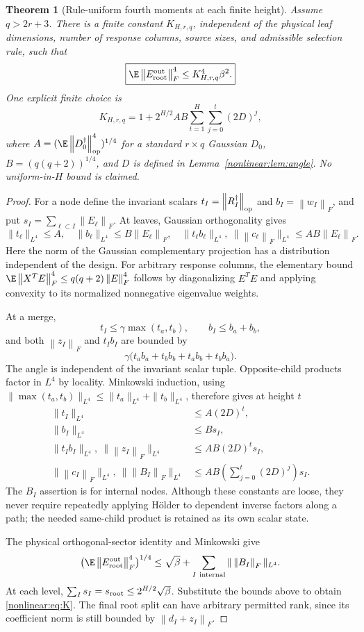 \documentclass[11pt,oneside,openany,a4paper]{book}
\numberwithin{equation}{chapter}
\newtheorem{theorem}{Theorem}[chapter]
\theoremstyle{definition}
\theoremstyle{remark}
\newcommand{\F}[1]{\left\lVert#1\right\rVert_F}
\newcommand{\op}[1]{\left\lVert#1\right\rVert_{\rm op}}
\begin{document}
\begin{theorem}[Rule-uniform fourth moments at each finite height]\label{nonlinear:thm:fourth}
Assume $q>2r+3$. There is a finite constant $K_{H,r,q}$, independent of the physical leaf dimensions, number of response columns, source sizes, and admissible selection rule, such that
\begin{equation}\label{nonlinear:eq:fourth}
 \boxed{\E\F{E_{\rm root}^{\rm out}}^4\le K_{H,r,q}^4\beta^2.}
\end{equation}
One explicit finite choice is
\begin{equation}\label{nonlinear:eq:K}
 K_{H,r,q}=1+2^{H/2}AB\sum_{t=1}^H\sum_{j=0}^t(2D)^j,
\end{equation}
where $A=(\E\op{D_0^\dagger}^4)^{1/4}$ for a standard $r\times q$ Gaussian $D_0$, $B=(q(q+2))^{1/4}$, and $D$ is defined in Lemma~\ref{nonlinear:lem:angle}. No uniform-in-$H$ bound is claimed.
\end{theorem}
\begin{proof}
For a node define the invariant scalars $t_I=\op{R_I^\dagger}$ and $b_I=\F{w_I}$, and put $s_I=\sum_{\ell\subset I}\F{E_\ell}$. At leaves, Gaussian orthogonality gives
\[
 \|t_\ell\|_{L^4}\le A,\quad
 \|b_\ell\|_{L^4}\le B\F{E_\ell},\quad
 \|t_\ell b_\ell\|_{L^4},\ \|\F{c_\ell}\|_{L^4}\le AB\F{E_\ell}.
\]
Here the norm of the Gaussian complementary projection has a distribution independent of the design. For arbitrary response columns, the elementary bound
$\E\F{X^TE}^4\le q(q+2)\F E^4$ follows by diagonalizing $E^TE$ and applying convexity to its normalized nonnegative eigenvalue weights.

At a merge,
\[
 t_I\le\gamma\max(t_a,t_b),\qquad b_I\le b_a+b_b,
\]
and both $\F{z_I}$ and $t_Ib_I$ are bounded by
\[
 \gamma\bigl(t_ab_a+t_bb_b+t_ab_b+t_bb_a\bigr).
\]
The angle is independent of the invariant scalar tuple. Opposite-child products factor in $L^4$ by locality. Minkowski induction, using $\|\max(t_a,t_b)\|_{L^4}\le\|t_a\|_{L^4}+\|t_b\|_{L^4}$, therefore gives at height $t$
\begin{align*}
 \|t_I\|_{L^4}&\le A(2D)^t,\\
 \|b_I\|_{L^4}&\le Bs_I,\\
 \|t_Ib_I\|_{L^4},\ \|\F{z_I}\|_{L^4}&\le AB(2D)^t s_I,\\
 \|\F{c_I}\|_{L^4},\ \|\F{B_I}\|_{L^4}
   &\le AB\left(\sum_{j=0}^t(2D)^j\right)s_I.
\end{align*}
The $B_I$ assertion is for internal nodes. Although these constants are loose, they never require repeatedly applying H\"older to dependent inverse factors along a path; the needed same-child product is retained as its own scalar state.

The physical orthogonal-sector identity and Minkowski give
\[
 \bigl(\E\F{E_{\rm root}^{\rm out}}^4\bigr)^{1/4}
 \le\sqrt\beta+\sum_{I\ {\rm internal}}\|\F{B_I}\|_{L^4}.
\]
At each level, $\sum_Is_I=s_{\rm root}\le2^{H/2}\sqrt\beta$. Substitute the bounds above to obtain \eqref{nonlinear:eq:K}. The final root split can have arbitrary permitted rank, since its coefficient norm is still bounded by $\F{d_I+z_I}$.
\end{proof}
\end{document}

